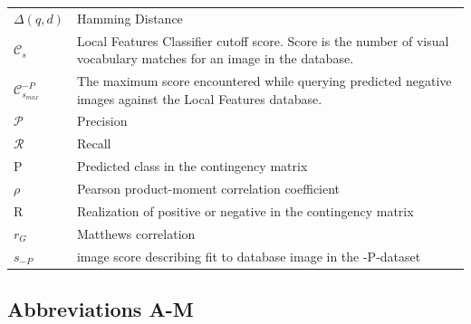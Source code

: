 \documentclass[english,12pt,a4paper,pdftex,elec,utf8, table]{aaltothesis}
\begin{document}
\begin{tabular}{ll}
$\Delta(q,d)$ & Hamming Distance\\
$\mathcal{C}_s$ & Local Features Classifier cutoff score. Score is the number of visual vocabulary matches for an image in the database.\\
$\mathcal{C}_{s_{max}}^{-P}$ & The maximum score encountered while querying predicted negative images against the Local Features database.\\
  $\mathcal{P}$ & Precision\\
  $\mathcal{R}$ & Recall\\
  P & Predicted class in the contingency matrix\\
  $\rho$ & Pearson product-moment correlation coefficient\\
  R & Realization of positive or negative in the contingency matrix\\
  $r_G$ & Matthews correlation\\
  $s_{-P}$ & image score describing fit to database image in the -P-dataset\\
\end{tabular}

\subsection*{Abbreviations A-M}
\end{document}
